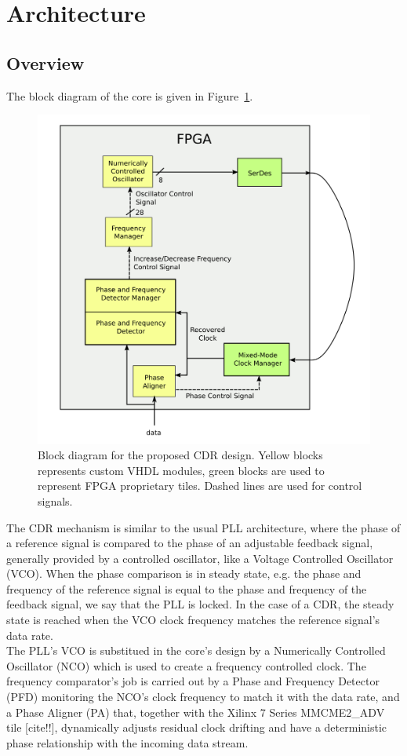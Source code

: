 \documentclass[12pt]{extarticle}
\renewcommand{\>}{\rangle} \renewcommand{\emptyset}{\varnothing}
\begin{document}
\section{Architecture}
\subsection{Overview}
The block diagram of the core is given in Figure~\ref{fig:cdr_overview}.

\begin{figure}[H]
  \centerline{\includegraphics[width=0.5\linewidth]{images/block}}
  \caption{Block diagram for the proposed CDR design. Yellow blocks represents
    custom VHDL modules, green blocks are used to represent FPGA proprietary
    tiles. Dashed lines are used for control signals.}
  \label{fig:cdr_overview}
\end{figure}

The CDR mechanism is similar to the usual PLL architecture, where the phase of a
reference signal is compared to the phase of an adjustable feedback signal,
generally provided by a controlled oscillator, like a Voltage Controlled
Oscillator (VCO). When the phase comparison is in steady state, e.g. the phase
and frequency of the reference signal is equal to the phase and frequency of the
feedback signal, we say that the PLL is locked. In the case of a CDR, the steady
state is reached when the VCO clock frequency
matches the reference signal's data rate.\\
The PLL's VCO is substitued in the core's design by a Numerically Controlled
Oscillator (NCO) which is used to create a frequency controlled clock. The
frequency comparator's job is carried out by a Phase and Frequency Detector
(PFD) monitoring the NCO's clock frequency to match it with the data rate, and a
Phase Aligner (PA) that, together with the Xilinx 7 Series MMCME2\_ADV tile
[cite!!], dynamically adjusts residual clock drifting and have a deterministic
phase
relationship with the incoming data stream.\\
\end{document}

